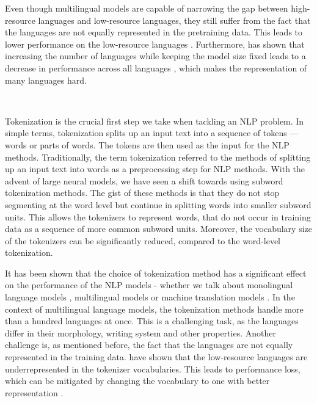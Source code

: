 Even though multilingual models are capable of narrowing the gap between high-resource languages and low-resource languages, they still suffer from the fact that the languages are not equally represented in the pretraining data. This leads to lower performance on the low-resource languages \cite{conneau_unsupervised_2020}. Furthermore, \citet{conneau_unsupervised_2020} has shown that increasing the number of languages while keeping the model size fixed leads to a decrease in performance across all languages \cite{conneau_unsupervised_2020}, which makes the representation of many languages hard. 

~

Tokenization is the crucial first step we take when tackling an NLP problem. In simple terms, tokenization splits up an input text into a sequence of tokens --- words or parts of words. The tokens are then used as the input for the NLP methods. Traditionally, the term tokenization referred to the methods of splitting up an input text into words as a preprocessing step for NLP methods. With the advent of large neural models, we have seen a shift towards using subword tokenization methods. The gist of these methods is that they do not stop segmenting at the word level but continue in splitting words into smaller subword units. This allows the tokenizers to represent words, that do not occur in training data as a sequence of more common subword units. Moreover, the vocabulary size of the tokenizers can be significantly reduced, compared to the word-level tokenization.


It has been shown that the choice of tokenization method has a significant effect on the performance of the NLP models - whether we talk about monolingual language models \cite{bostrom_byte_2020}, multilingual models \cite{rust_how_2021} or machine translation models \cite{kudo_sentencepiece_2018,gowda_finding_2020}. In the context of multilingual language models, the tokenization methods handle more than a hundred languages at once. This is a challenging task, as the languages differ in their morphology, writing system and other properties. Another challenge is, as mentioned before, the fact that the languages are not equally represented in the training data. \citet{rust_how_2021} have shown that the low-resource languages are underrepresented in the tokenizer vocabularies. This leads to performance loss, which can be mitigated by changing the vocabulary to one with better representation \cite{rust_how_2021}.

